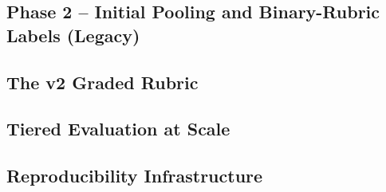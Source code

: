 \subsection{Phase 2 -- Initial Pooling and Binary-Rubric Labels (Legacy)}

\subsection{The v2 Graded Rubric}

\subsection{Tiered Evaluation at Scale}

\subsection{Reproducibility Infrastructure}
